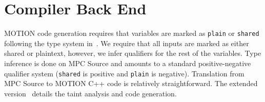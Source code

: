 \section{Compiler Back End}
\label{sec:backend}

MOTION code generation requires that variables are marked as \texttt{plain} or \texttt{shared}
following the type system in~. We require that all inputs are marked as either shared or plaintext,
however, we infer qualifiers for the rest of the variables. Type inference is done on MPC Source 
and amounts to a standard positive-negative qualifier system (\texttt{shared} is positive and \texttt{plain} is negative). 
Translation from MPC Source to MOTION C++ code is relatively straightforward. The extended version~\cite{Anon_TR} details the taint analysis and code generation. 


